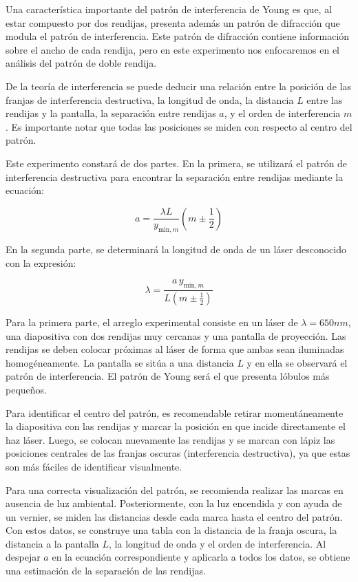 \documentclass[article,12pt]{elsarticle}
\begin{document}
Una característica importante del patrón de interferencia de Young es que, al estar compuesto por dos rendijas, presenta además un patrón de difracción que modula el patrón de interferencia. Este patrón de difracción contiene información sobre el ancho de cada rendija, pero en este experimento nos enfocaremos en el análisis del patrón de doble rendija. 

De la teoría de interferencia se puede deducir una relación entre la posición de las franjas de interferencia destructiva, la longitud de onda, la distancia $L$ entre las rendijas y la pantalla, la separación entre rendijas $a$, y el orden de interferencia $m$. Es importante notar que todas las posiciones se miden con respecto al centro del patrón.

Este experimento constará de dos partes. En la primera, se utilizará el patrón de interferencia destructiva para encontrar la separación entre rendijas mediante la ecuación:

\begin{equation}
a = \frac{\lambda L}{y_{\text{min}, m}} \left( m \pm \frac{1}{2} \right)
\end{equation}

En la segunda parte, se determinará la longitud de onda de un láser desconocido con la expresión:

\begin{equation}
\lambda = \frac{a \, y_{\text{min}, m}}{L \left( m \pm \frac{1}{2} \right)}
\end{equation}

Para la primera parte, el arreglo experimental consiste en un láser de $\lambda=650nm$, una diapositiva con dos rendijas muy cercanas y una pantalla de proyección. Las rendijas se deben colocar próximas al láser de forma que ambas sean iluminadas homogéneamente. La pantalla se sitúa a una distancia $L$ y en ella se observará el patrón de interferencia. El patrón de Young será el que presenta lóbulos más pequeños.

Para identificar el centro del patrón, es recomendable retirar momentáneamente la diapositiva con las rendijas y marcar la posición en que incide directamente el haz láser. Luego, se colocan nuevamente las rendijas y se marcan con lápiz las posiciones centrales de las franjas oscuras (interferencia destructiva), ya que estas son más fáciles de identificar visualmente.

Para una correcta visualización del patrón, se recomienda realizar las marcas en ausencia de luz ambiental. Posteriormente, con la luz encendida y con ayuda de un vernier, se miden las distancias desde cada marca hasta el centro del patrón. Con estos datos, se construye una tabla con la distancia de la franja oscura, la distancia a la pantalla $L$, la longitud de onda y el orden de interferencia. Al despejar $a$ en la ecuación correspondiente y aplicarla a todos los datos, se obtiene una estimación de la separación de las rendijas.
\end{document}
